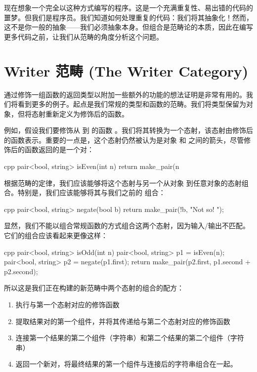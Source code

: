 现在想象一个完全以这种方式编写的程序。这是一个充满重复性、易出错的代码的噩梦。但我们是程序员。我们知道如何处理重复的代码：我们将其抽象化！然而，这不是你一般的抽象——我们必须抽象本身。但组合是范畴论的本质，因此在编写更多代码之前，让我们从范畴的角度分析这个问题。

\section{Writer 范畴 (The Writer Category)}

通过修饰一组函数的返回类型以附加一些额外的功能的想法证明是非常有用的。我们将看到更多的例子。起点是我们常规的类型和函数的范畴。我们将类型保留为对象，但将态射重新定义为修饰后的函数。

例如，假设我们要修饰从  到  的函数 。我们将其转换为一个态射，该态射由修饰后的函数表示。重要的一点是，这个态射仍然被认为是对象  和  之间的箭头，尽管修饰后的函数返回的是一个对：

\begin{snip}{cpp}
  pair<bool, string> isEven(int n) {
    return make_pair(n %
  }
\end{snip}
根据范畴的定律，我们应该能够将这个态射与另一个从对象  到任意对象的态射组合。特别是，我们应该能够将其与我们之前的  组合：

\begin{snip}{cpp}
  pair<bool, string> negate(bool b) {
    return make_pair(!b, "Not so! ");
  }
\end{snip}
显然，我们不能以组合常规函数的方式组合这两个态射，因为输入/输出不匹配。它们的组合应该看起来更像这样：

\begin{snip}{cpp}
  pair<bool, string> isOdd(int n) {
    pair<bool, string> p1 = isEven(n);
    pair<bool, string> p2 = negate(p1.first);
    return make_pair(p2.first, p1.second + p2.second);
  }
\end{snip}
所以这是我们正在构建的新范畴中两个态射的组合的配方：

\begin{enumerate}
  \tightlist
  \item
  执行与第一个态射对应的修饰函数
  \item
  提取结果对的第一个组件，并将其传递给与第二个态射对应的修饰函数
  \item
  连接第一个结果的第二个组件（字符串）和第二个结果的第二个组件（字符串）
  \item
  返回一个新对，将最终结果的第一个组件与连接后的字符串组合在一起。
\end{enumerate}

